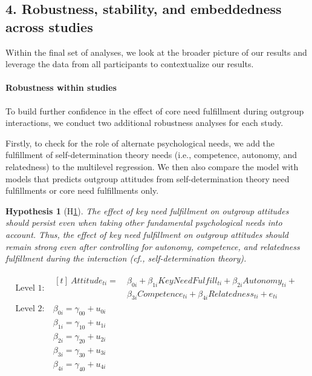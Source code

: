 \documentclass[man, 12pt, a4paper, mask]{apa7}
\theoremstyle{break}
\theoremstyle{plain}
\newtheorem{hyp}{Hypothesis}
\begin{document}
\subsection{4. Robustness, stability, and embeddedness across studies}
Within the final set of analyses, we look at the broader picture of our results and leverage the data from all participants to contextualize our results.  

\paragraph{Robustness within studies}
To build further confidence in the effect of core need fulfillment during outgroup interactions, we conduct two additional robustness analyses for each study.

Firstly, to check for the role of alternate psychological needs, we add the fulfillment of self-determination theory needs (i.e., competence, autonomy, and relatedness) to the multilevel regression. We then also compare the model with models that predicts outgroup attitudes from self-determination theory need fulfillments or core need fulfillments only. 

\begin{mdframed}[style=mdfhypothesis]
    \begin{hyp}[H\ref{hyp:keyNeedSDT}] \label{hyp:keyNeedSDT}
    The effect of key need fulfillment on outgroup attitudes should persist even when taking other fundamental psychological needs into account. Thus, the effect of key need fulfillment on outgroup attitudes should remain strong even after controlling for autonomy, competence, and relatedness fulfillment during the interaction (cf., self-determination theory). 
    \end{hyp}
    
    \begin{fleqn}[\eqskip-\subhypskip]
      \begin{equation} \label{eq:SlopesAttCoreSdt}
        \begin{split}
          \textrm{Level 1:} &
            \begin{aligned}[t]
              \ Attitude_{ti} =  &\ \beta_{0i} + \beta_{1i}KeyNeedFulfill_{ti} + \beta_{2i}Autonomy_{ti} + \\
                                 &\ \beta_{3i}Competence_{ti} + \beta_{4i}Relatedness_{ti} + e_{ti}
            \end{aligned} \\
          \textrm{Level 2:} &\ \beta_{0i} = \gamma_{00} + u_{0i} \\
                            &\ \beta_{1i} = \gamma_{10} + u_{1i} \\
                            &\ \beta_{2i} = \gamma_{20} + u_{2i} \\
                            &\ \beta_{3i} = \gamma_{30} + u_{3i} \\
                            &\ \beta_{4i} = \gamma_{40} + u_{4i}
        \end{split} 
      \end{equation}
    \end{fleqn}
\end{mdframed}
\end{document}
